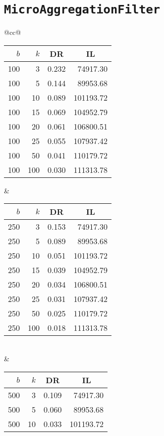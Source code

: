 \section*{\texttt{MicroAggregationFilter}}

\begin{table}[H]
	\centering
	\begin{tabular}{@{}cc@{}}
		\begin{tabular}{@{}rrrr@{}}
			\toprule
			$b$ & $k$ & \multicolumn{1}{c}{DR} & \multicolumn{1}{c}{IL} \\ \midrule
			100  & 3   & 0.232 & 74917.30  \\
			100  & 5   & 0.144 & 89953.68  \\
			100  & 10  & 0.089 & 101193.72 \\
			100  & 15  & 0.069 & 104952.79 \\
			100  & 20  & 0.061 & 106800.51 \\
			100  & 25  & 0.055 & 107937.42 \\
			100  & 50  & 0.041 & 110179.72 \\
			100  & 100 & 0.030 & 111313.78 \\ \bottomrule
		\end{tabular}
		&
		\begin{tabular}{@{}rrrr@{}}
			\toprule
			$b$ & $k$ & \multicolumn{1}{c}{DR} & \multicolumn{1}{c}{IL} \\ \midrule
			250  & 3   & 0.153 & 74917.30  \\
			250  & 5   & 0.089 & 89953.68  \\
			250  & 10  & 0.051 & 101193.72 \\
			250  & 15  & 0.039 & 104952.79 \\
			250  & 20  & 0.034 & 106800.51 \\
			250  & 25  & 0.031 & 107937.42 \\
			250  & 50  & 0.025 & 110179.72 \\
			250  & 100 & 0.018 & 111313.78 \\ \bottomrule
		\end{tabular}
		\\ & \\
		\begin{tabular}{@{}rrrr@{}}
			\toprule
			$b$ & $k$ & \multicolumn{1}{c}{DR} & \multicolumn{1}{c}{IL} \\ \midrule
			500  & 3   & 0.109 & 74917.30  \\
			500  & 5   & 0.060 & 89953.68  \\
			500  & 10  & 0.033 & 101193.72 \\

\end{tabular}
\end{tabular}
\end{table}

